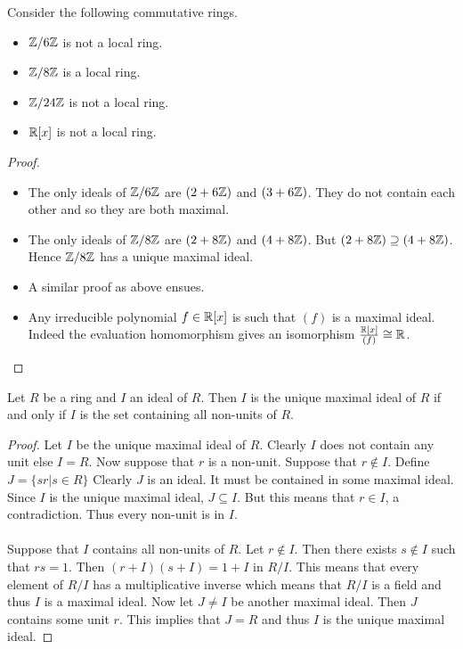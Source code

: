 \documentclass[a4paper]{article}
\begin{document}
\begin{eg}{}{} Consider the following commutative rings. 
\begin{itemize}
\item $\mathbb{Z}/6\mathbb{Z}$ is not a local ring. 
\item $\mathbb{Z}/8\mathbb{Z}$ is a local ring. 
\item $\mathbb{Z}/24\mathbb{Z}$ is not a local ring. 
\item $\mathbb{R}[x]$ is not a local ring. 
\end{itemize} \tcbline
\begin{proof}~\\
\begin{itemize}
\item The only ideals of $\mathbb{Z}/6\mathbb{Z}$ are $(2+6\mathbb{Z})$ and $(3+6\mathbb{Z})$. They do not contain each other and so they are both maximal. 
\item The only ideals of $\mathbb{Z}/8\mathbb{Z}$ are $(2+8\mathbb{Z})$ and $(4+8\mathbb{Z})$. But $(2+8\mathbb{Z})\supseteq(4+8\mathbb{Z})$. Hence $\mathbb{Z}/8\mathbb{Z}$ has a unique maximal ideal. 
\item A similar proof as above ensues. 
\item Any irreducible polynomial $f\in\mathbb{R}[x]$ is such that $(f)$ is a maximal ideal. Indeed the evaluation homomorphism gives an isomorphism $\frac{\mathbb{R}[x]}{(f)}\cong\mathbb{R}$. 
\end{itemize}
\end{proof}
\end{eg}

\begin{prp}{}{} Let $R$ be a ring and $I$ an ideal of $R$. Then $I$ is the unique maximal ideal of $R$ if and only if $I$ is the set containing all non-units of $R$. \tcbline
\begin{proof}
Let $I$ be the unique maximal ideal of $R$. Clearly $I$ does not contain any unit else $I=R$. Now suppose that $r$ is a non-unit. Suppose that $r\notin I$. Define $J=\{sr|s\in R\}$ Clearly $J$ is an ideal. It must be contained in some maximal ideal. Since $I$ is the unique maximal ideal, $J\subseteq I$. But this means that $r\in I$, a contradiction. Thus every non-unit is in $I$. \\~\\
Suppose that $I$ contains all non-units of $R$. Let $r\notin I$. Then there exists $s\notin I$ such that $rs=1$. Then $(r+I)(s+I)=1+I$ in $R/I$. This means that every element of $R/I$ has a multiplicative inverse which means that $R/I$ is a field and thus $I$ is a maximal ideal. Now let $J\neq I$ be another maximal ideal. Then $J$ contains some unit $r$. This implies that $J=R$ and thus $I$ is the unique maximal ideal. 
\end{proof}
\end{prp}
\end{document}
